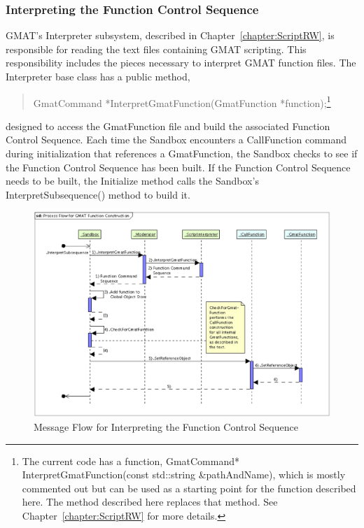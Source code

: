 \subsubsection{Interpreting the Function Control Sequence}

GMAT's Interpreter subsystem, described in Chapter~\ref{chapter:ScriptRW}, is responsible for
reading the text files containing GMAT scripting.  This responsibility includes the pieces
necessary to interpret GMAT function files.  The Interpreter base class has a public method,

\begin{quote}
GmatCommand *InterpretGmatFunction(GmatFunction *function);\footnote{The current code has a
function, GmatCommand* InterpretGmatFunction(const std::string \&pathAndName), which is mostly
commented out but can be used as a starting point for the function described here.  The method
described here replaces that method. See Chapter~\ref{chapter:ScriptRW} for more details.}
\end{quote}

\noindent designed to access the GmatFunction file and build the associated Function Control
Sequence.  Each time the Sandbox encounters a CallFunction command during initialization that
references a GmatFunction, the Sandbox checks to see if the Function Control Sequence has been
built.  If the Function Control Sequence needs to be built, the Initialize method calls the
Sandbox's InterpretSubsequence() method to build it.

\begin{figure}[htb]
\begin{center}
\includegraphics[scale=0.5]{Images/ProcessFlowforGMATFunctionConstruction.eps}
\caption{\label{figure:FunctionInterpreterFlow}Message Flow for Interpreting the Function Control
Sequence}
\end{center}
\end{figure}

